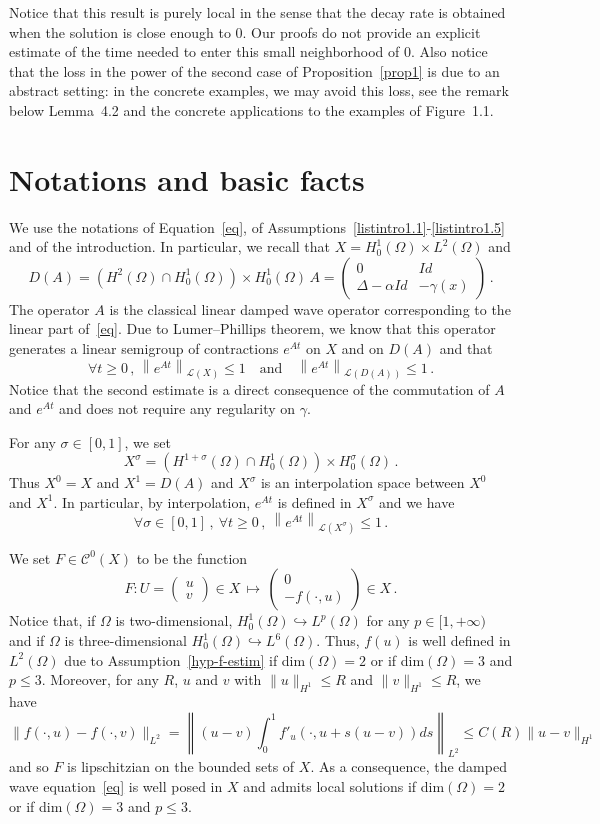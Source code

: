\documentclass[11pt]{article}
\theoremstyle{definition}
\numberwithin{equation}{section}
\numberwithin{figure}{section}
\numberwithin{table}{section}
\newcommand{\Cc}{\mathcal{C}}
\newcommand{\Lc}{\mathcal{L}}
\newcommand{\vect}[2]{\left(
\begin{matrix} #1 \\ #2
\end{matrix}\right)}
\let\oldforall\forall
\renewcommand*{\forall}{\mathrel{\oldforall}}
\begin{document}
Notice that this result is purely local in the sense that the decay rate is obtained when the solution is close enough to $0$. Our proofs do not provide an explicit estimate of the time needed to enter this small neighborhood of $0$. Also notice that the loss in the power of the second case of Proposition~\ref{prop1} is due to an abstract setting: in the concrete examples, we may avoid this loss, see the remark below Lemma~4.2 and the concrete applications to the examples of Figure~1.1.

\section{Notations and basic facts}\label{section-basic}
We use the notations of Equation~\eqref{eq}, of Assumptions~\eqref{listintro1.1}-\eqref{listintro1.5} and of the introduction. In particular, we recall that $X=H^1_0(\Omega)\times L^2(\Omega)$ and
\[
D(A)=\left(H^2(\Omega)\cap H^1_0(\Omega)\right)\times H^1_0(\Omega)\,
A =
\begin{pmatrix}
0 & Id \\ \Delta-\alpha Id & -\gamma(x)
\end{pmatrix}\,.
\]
The operator $A$ is the classical linear damped wave operator corresponding to the linear part of~\eqref{eq}. Due to Lumer--Phillips theorem, we know that this operator generates a linear semigroup of contractions $e^{At}$ on $X$ and on $D(A)$ and that
\[
\forall t\geq 0\,,\,\left\|e^{At}\right\|_{\Lc(X)}\leq 1\quad\text{and}\quad\left\|e^{At}\right\|_{\Lc(D(A))}\leq 1\,.
\]
Notice that the second estimate is a direct consequence of the commutation of $A$ and $e^{At}$ and does not require any regularity on $\gamma$.

For any $\sigma\in [0,1]$, we set
\[
X^\sigma=\left(H^{1+\sigma}(\Omega)\cap H^1_0(\Omega)\right)\times
H^\sigma_0(\Omega)\,.
\]
Thus $X^0=X$ and $X^1=D(A)$ and $X^\sigma$ is an interpolation space between $X^0$ and $X^1$. In particular, by interpolation, $e^{At}$ is defined in $X^\sigma$ and we have
\begin{equation}\label{eq-bound-semigroup}
\forall \sigma\in [0,1]\,,\:\forall t\geq 0\,,\:
\left\|e^{At}\right\|_{\Lc(X^\sigma)}\leq 1\,.
\end{equation}

We set $F\in\Cc^0(X)$ to be the function
\begin{equation}\label{def-F}
F:U=\vect uv \in X\,\longmapsto\,\vect 0 {-f(\cdot,u)} \in X\,.
\end{equation}
Notice that, if $\Omega$ is two-dimensional, $H^1_0(\Omega) \hookrightarrow L^{p}(\Omega)$ for any $p\in[1,+\infty)$ and if $\Omega$ is three-dimensional $H^1_0(\Omega) \hookrightarrow L^6(\Omega)$. Thus, $f(u)$ is well defined in $L^2(\Omega)$ due to Assumption~\eqref{hyp-f-estim} if dim$(\Omega)=2$ or if dim$(\Omega)=3$ and $p\leq 3$. Moreover, for any $R$, $u$ and $v$ with $\|u\|_{H^1}\leq R$ and $\|v\|_{H^1}\leq R$, we have
\[
\|f(\cdot,u)-f(\cdot,v)\|_{L^2}=\left\|(u-v)\int_0^1
f'_u(\cdot,u+s(u-v))ds\right\|_{L^2}
\leq C(R)\|u-v\|_{H^1}
\]
and so $F$ is lipschitzian on the bounded sets of $X$. As a consequence, the damped wave equation~\eqref{eq} is well posed in $X$ and admits local solutions if dim$(\Omega)=2$ or if dim$(\Omega)=3$ and $p\leq 3$.
\end{document}
